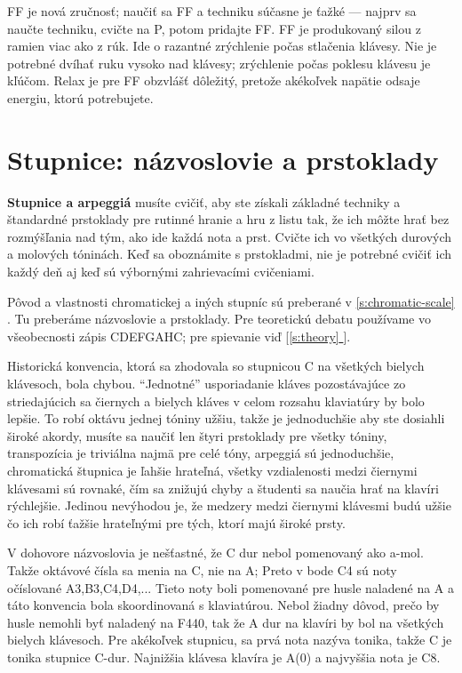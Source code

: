 \documentclass[11pt,a4paper]{book}
\newcommand*{\fullref}[1]{\hyperref[{#1}]{\ref*{#1} \nameref*{#1}}} %
\newcommand*{\fullrefp}[1]{[\fullref{#1}]} %
\begin{document}
FF je nová zručnosť; naučiť sa FF a techniku súčasne je ťažké — najprv sa naučte techniku, cvičte na P, potom pridajte FF. FF je produkovaný silou z ramien viac ako z rúk. Ide o razantné zrýchlenie počas stlačenia klávesy. Nie je potrebné dvíhať ruku vysoko nad klávesy; zrýchlenie počas poklesu klávesu je kľúčom. Relax je pre FF obzvlášť dôležitý, pretože akékoľvek napätie odsaje energiu, ktorú potrebujete.


\section{Stupnice: názvoslovie a prstoklady}\label{s:scales}
\textbf{Stupnice a arpeggiá} musíte cvičiť, aby ste získali základné techniky a štandardné prstoklady pre rutinné hranie a hru z listu tak, že ich môžte hrať bez rozmýšľania nad tým, ako ide každá nota a prst. Cvičte ich vo všetkých durových a molových tóninách. Keď sa oboznámite s prstokladmi, nie je potrebné cvičiť ich každý deň aj keď sú výbornými zahrievacími cvičeniami.

Pôvod a vlastnosti chromatickej a iných stupníc sú preberané v \fullref{s:chromatic-scale}. Tu preberáme názvoslovie a prstoklady. Pre teoretickú debatu používame vo všeobecnosti zápis CDEFGAHC; pre spievanie viď \fullrefp{s:theory}.

Historická konvencia, ktorá sa zhodovala so stupnicou C na všetkých bielych klávesoch, bola chybou. “Jednotné” usporiadanie kláves pozostávajúce zo striedajúcich sa čiernych a bielych kláves v celom rozsahu klaviatúry by bolo lepšie. To robí oktávu jednej tóniny užšiu, takže je jednoduchšie aby ste dosiahli široké akordy, musíte sa naučiť len štyri prstoklady pre všetky tóniny, transpozícia je triviálna najmä pre celé tóny, arpeggiá sú jednoduchšie, chromatická štupnica je ľahšie hrateľná, všetky vzdialenosti medzi čiernymi klávesami sú rovnaké, čím sa znižujú chyby a študenti sa naučia hrať na klavíri rýchlejšie. Jedinou nevýhodou je, že medzery medzi čiernymi klávesmi budú užšie čo ich  robí ťažšie hrateľnými pre tých, ktorí majú široké prsty.

V dohovore názvoslovia je nešťastné, že C dur nebol pomenovaný ako a-mol. Takže oktávové čísla sa menia na C, nie na A; Preto v bode C4 sú noty očíslované A3,B3,C4,D4,... Tieto noty boli pomenované pre husle naladené na A a táto konvencia bola skoordinovaná s klaviatúrou. Nebol žiadny dôvod, prečo by husle nemohli byť naladený na F440, tak že A dur na klavíri by bol na všetkých bielych klávesoch. Pre akékoľvek stupnicu, sa prvá nota nazýva tonika, takže C je tonika stupnice C-dur. Najnižšia klávesa klavíra je A(0) a najvyššia nota je C8.
\end{document}
